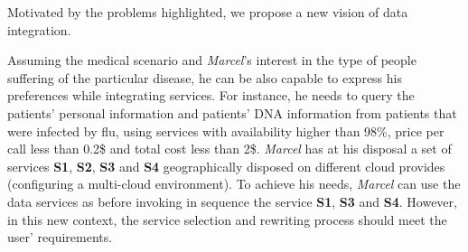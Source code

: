 
Motivated by the problems highlighted, we propose a new vision of data integration.


Assuming the medical scenario and \textit{Marcel}'s interest in the type of people
suffering of the particular disease, he can be
also capable to express his preferences while integrating services. For instance, he needs to query the patients' personal information and patients' DNA information from patients that were infected by flu, using services with availability higher than 98\%, price per call less than 0.2\$ and total cost less than 2\$.
\textit{Marcel} has at his disposal a set of services \textbf{S1}, \textbf{S2}, \textbf{S3} and \textbf{S4} geographically disposed on different cloud provides (configuring a multi-cloud environment).
To achieve his needs, \textit{Marcel} can use the data services as before invoking in sequence the service \textbf{S1}, \textbf{S3} and \textbf{S4}. However, in this new context, the service selection and rewriting process should meet the user' requirements.   


